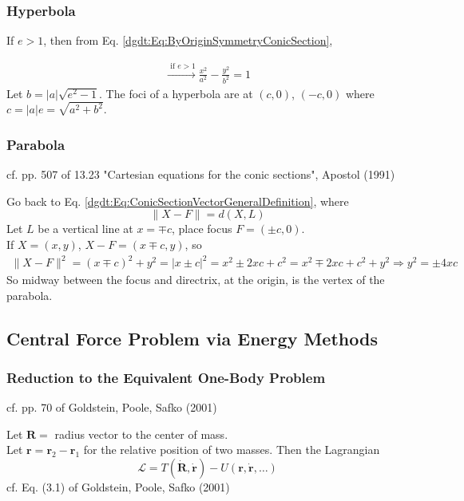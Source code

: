 \subsubsection{Hyperbola}

If $e > 1$, then from Eq. \ref{dgdt:Eq:ByOriginSymmetryConicSection},

\[
\begin{gathered}
\xrightarrow{ \text{ if } e > 1 } \frac{x^2 }{ a^2 } - \frac{y^2}{b^2} = 1
\end{gathered}
\]
Let $b = |a| \sqrt{ e^2 - 1}$. The foci of a hyperbola are at $(c,0)$, $(-c,0)$ where $c= |a| e = \sqrt{ a^2 + b^2}$. 

\subsubsection{Parabola}

cf. pp. 507 of  13.23 "Cartesian equations for the conic sections", Apostol (1991) \cite{dgdt:Apos1991}

Go back to Eq. \ref{dgdt:Eq:ConicSectionVectorGeneralDefinition}, where
\[
\| X - F \| = d(X, L)
\]
Let $L$ be a vertical line at $x = \mp c$, place focus $F = (\pm c, 0)$. \\
If $X = (x,y)$, $X-F = (x \mp c, y)$, so 
\[
\begin{gathered}
\| X- F \|^2 = (x \mp c)^2 + y^2 = | x \pm c|^2 = x^2 \pm 2xc + c^2 = x^2 \mp 2xc + c^2 + y^2
\Longrightarrow y^2 = \pm 4xc
\end{gathered}
\]
So midway between the focus and directrix, at the origin, is the vertex of the parabola.

\subsection{Central Force Problem via Energy Methods}

\subsubsection{Reduction to the Equivalent One-Body Problem}

cf. pp. 70 of Goldstein, Poole, Safko (2001) \cite{dgdt:GPS2001}

Let $\mathbf{R} = $ radius vector to the center of mass. \\

Let $\mathbf{r} = \mathbf{r}_2 - \mathbf{r}_1$ for the relative position of two masses. Then the Lagrangian
\begin{equation}
\mathcal{L} = T(\dot{\mathbf{R}}, \dot{ \mathbf{r}} ) - U (\mathbf{r}, \dot{\mathbf{r}}, \dots )
\end{equation}
cf. Eq. (3.1) of Goldstein, Poole, Safko (2001) \cite{dgdt:GPS2001}


